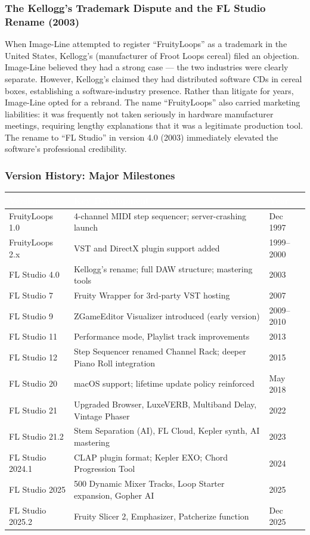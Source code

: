 \documentclass[11pt,letterpaper]{article}
\newcommand{\tableheader}[1]{\textbf{\sffamily\textcolor{white}{#1}}}
\begin{document}
\subsubsection{The Kellogg's Trademark Dispute and the FL Studio Rename (2003)}

When Image-Line attempted to register ``FruityLoops'' as a trademark in the United States, Kellogg's (manufacturer of Froot Loops cereal) filed an objection. Image-Line believed they had a strong case --- the two industries were clearly separate. However, Kellogg's claimed they had distributed software CDs in cereal boxes, establishing a software-industry presence. Rather than litigate for years, Image-Line opted for a rebrand. The name ``FruityLoops'' also carried marketing liabilities: it was frequently not taken seriously in hardware manufacturer meetings, requiring lengthy explanations that it was a legitimate production tool. The rename to ``FL Studio'' in version 4.0 (2003) immediately elevated the software's professional credibility.

\subsubsection{Version History: Major Milestones}

\begin{center}
\begin{tabularx}{\textwidth}{C{2.5cm}XL{3cm}}
\toprule
{}
\tableheader{Version} & \tableheader{Key Development} & \tableheader{Year} \\
\midrule
FruityLoops 1.0 & 4-channel MIDI step sequencer; server-crashing launch & Dec 1997 \\
FruityLoops 2.x & VST and DirectX plugin support added & 1999--2000 \\
FL Studio 4.0 & Kellogg's rename; full DAW structure; mastering tools & 2003 \\
FL Studio 7 & Fruity Wrapper for 3rd-party VST hosting & 2007 \\
FL Studio 9 & ZGameEditor Visualizer introduced (early version) & 2009--2010 \\
FL Studio 11 & Performance mode, Playlist track improvements & 2013 \\
FL Studio 12 & Step Sequencer renamed Channel Rack; deeper Piano Roll integration & 2015 \\
FL Studio 20 & macOS support; lifetime update policy reinforced & May 2018 \\
FL Studio 21 & Upgraded Browser, LuxeVERB, Multiband Delay, Vintage Phaser & 2022 \\
FL Studio 21.2 & Stem Separation (AI), FL Cloud, Kepler synth, AI mastering & 2023 \\
FL Studio 2024.1 & CLAP plugin format; Kepler EXO; Chord Progression Tool & 2024 \\
FL Studio 2025 & 500 Dynamic Mixer Tracks, Loop Starter expansion, Gopher AI & 2025 \\
FL Studio 2025.2 & Fruity Slicer 2, Emphasizer, Patcherize function & Dec 2025 \\
\bottomrule
\end{tabularx}
\end{center}
\end{document}
